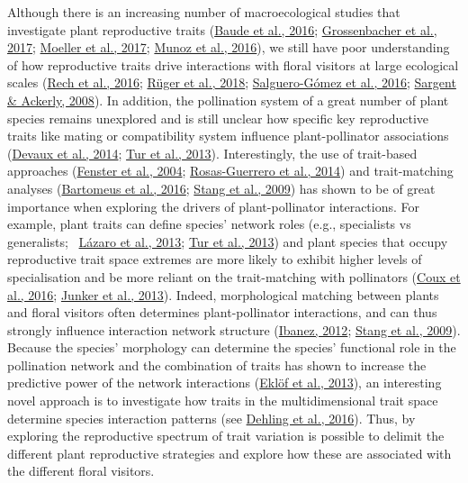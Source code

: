 \documentclass[
  12pt,
  a4paper,
]{article}
\begin{document}
Although there is an increasing number of macroecological studies that investigate plant reproductive traits (\protect\hyperlink{ref-baude2016}{Baude et al., 2016}; \protect\hyperlink{ref-grossenbacher2017}{Grossenbacher et al., 2017}; \protect\hyperlink{ref-moeller2017}{Moeller et al., 2017}; \protect\hyperlink{ref-munoz2016}{Munoz et al., 2016}), we still have poor understanding of how reproductive traits drive interactions with floral visitors at large ecological scales (\protect\hyperlink{ref-rech2016}{Rech et al., 2016}; \protect\hyperlink{ref-ruger2018}{Rüger et al., 2018}; \protect\hyperlink{ref-salguero2016}{Salguero-Gómez et al., 2016}; \protect\hyperlink{ref-sargent2008}{Sargent \& Ackerly, 2008}). In addition, the pollination system of a great number of plant species remains unexplored and is still unclear how specific key reproductive traits like mating or compatibility system influence plant-pollinator associations (\protect\hyperlink{ref-devaux2014}{Devaux et al., 2014}; \protect\hyperlink{ref-tur2013}{Tur et al., 2013}). Interestingly, the use of trait-based approaches (\protect\hyperlink{ref-fenster2004}{Fenster et al., 2004}; \protect\hyperlink{ref-rosas2014}{Rosas-Guerrero et al., 2014}) and trait-matching analyses (\protect\hyperlink{ref-bartomeus2016}{Bartomeus et al., 2016}; \protect\hyperlink{ref-stang2009}{Stang et al., 2009}) has shown to be of great importance when exploring the drivers of plant-pollinator interactions. For example, plant traits can define species' network roles (e.g., specialists vs generalists;~ \protect\hyperlink{ref-lazaro2013}{Lázaro et al., 2013}; \protect\hyperlink{ref-tur2013}{Tur et al., 2013}) and plant species that occupy reproductive trait space extremes are more likely to exhibit higher levels of specialisation and be more reliant on the trait-matching with pollinators (\protect\hyperlink{ref-coux2016}{Coux et al., 2016}; \protect\hyperlink{ref-junker2013}{Junker et al., 2013}). Indeed, morphological matching between plants and floral visitors often determines plant-pollinator interactions, and can thus strongly influence interaction network structure (\protect\hyperlink{ref-ibanez2012}{Ibanez, 2012}; \protect\hyperlink{ref-stang2009}{Stang et al., 2009}). Because the species' morphology can determine the species' functional role in the pollination network and the combination of traits has shown to increase the predictive power of the network interactions (\protect\hyperlink{ref-eklof2013}{Eklöf et al., 2013}), an interesting novel approach is to investigate how traits in the multidimensional trait space determine species interaction patterns (see \protect\hyperlink{ref-dehling2016}{Dehling et al., 2016}). Thus, by exploring the reproductive spectrum of trait variation is possible to delimit the different plant reproductive strategies and explore how these are associated with the different floral visitors.
\end{document}
